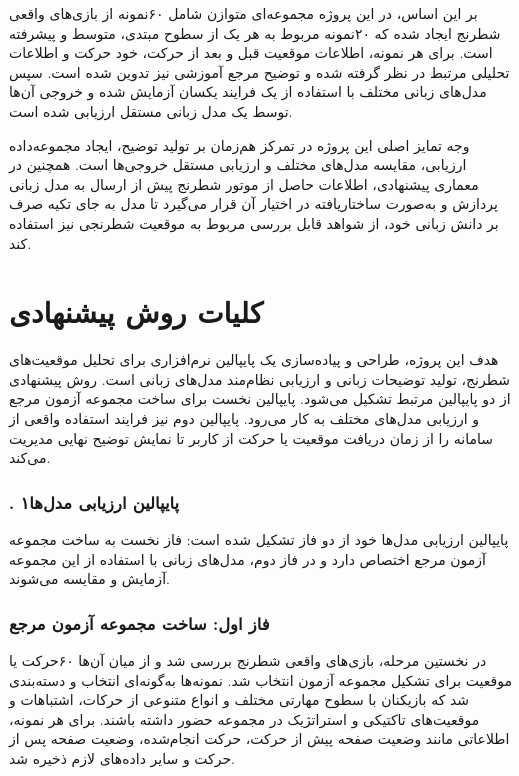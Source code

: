 بر این اساس، در این پروژه مجموعه‌ای متوازن شامل  ۶۰نمونه از بازی‌های واقعی شطرنج ایجاد شده که  ۲۰نمونه مربوط به هر یک از سطوح مبتدی، متوسط و پیشرفته است. برای هر نمونه، اطلاعات موقعیت قبل و بعد از حرکت، خود حرکت و اطلاعات تحلیلی مرتبط در نظر گرفته شده و توضیح مرجع آموزشی نیز تدوین شده است. سپس مدل‌های زبانی مختلف با استفاده از یک فرایند یکسان آزمایش شده و خروجی آن‌ها توسط یک مدل زبانی مستقل ارزیابی شده است.

وجه تمایز اصلی این پروژه در تمرکز هم‌زمان بر تولید توضیح، ایجاد مجموعه‌داده ارزیابی، مقایسه مدل‌های مختلف و ارزیابی مستقل خروجی‌ها است. همچنین در معماری پیشنهادی، اطلاعات حاصل از موتور شطرنج پیش از ارسال به مدل زبانی پردازش و به‌صورت ساختاریافته در اختیار آن قرار می‌گیرد تا مدل به جای تکیه صرف بر دانش زبانی خود، از شواهد قابل بررسی مربوط به موقعیت شطرنجی نیز استفاده کند.

\section{کلیات روش پیشنهادی}

هدف این پروژه، طراحی و پیاده‌سازی یک پایپالین نرم‌افزاری برای تحلیل موقعیت‌های شطرنج، تولید توضیحات زبانی و ارزیابی نظام‌مند مدل‌های زبانی است. روش پیشنهادی از دو پایپالین مرتبط تشکیل می‌شود. پایپالین نخست برای ساخت مجموعه آزمون مرجع و ارزیابی مدل‌های مختلف به کار می‌رود. پایپالین دوم نیز فرایند استفاده واقعی از سامانه را از زمان دریافت موقعیت یا حرکت از کاربر تا نمایش توضیح نهایی مدیریت می‌کند.

\subsubsection*{. ۱پایپالین ارزیابی مدل‌ها}

پایپالین ارزیابی مدل‌ها خود از دو فاز تشکیل شده است: فاز نخست به ساخت مجموعه آزمون مرجع اختصاص دارد و در فاز دوم، مدل‌های زبانی با استفاده از این مجموعه آزمایش و مقایسه می‌شوند.

\subsubsection*{فاز اول: ساخت مجموعه آزمون مرجع}

در نخستین مرحله، بازی‌های واقعی شطرنج بررسی شد و از میان آن‌ها  ۶۰حرکت یا موقعیت برای تشکیل مجموعه آزمون انتخاب شد. نمونه‌ها به‌گونه‌ای انتخاب و دسته‌بندی شد که بازیکنان با سطوح مهارتی مختلف و انواع متنوعی از حرکات، اشتباهات و موقعیت‌های تاکتیکی و استراتژیک در مجموعه حضور داشته باشند. برای هر نمونه، اطلاعاتی مانند وضعیت صفحه پیش از حرکت، حرکت انجام‌شده، وضعیت صفحه پس از حرکت و سایر داده‌های لازم ذخیره شد.

